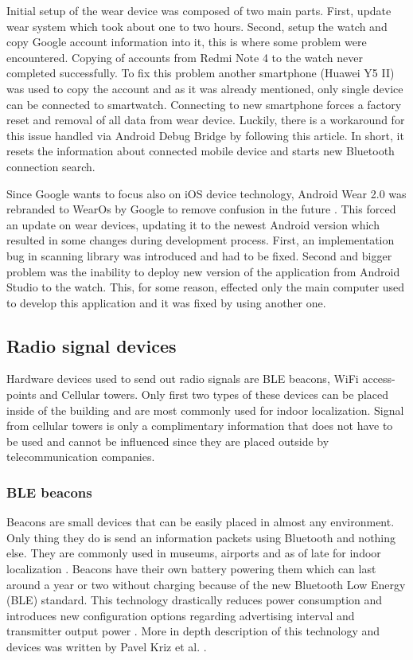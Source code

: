 Initial setup of the wear device was composed of two main parts. First, update wear system which took about one to two hours. Second, setup the watch and copy Google account information into it, this is where some problem were encountered. Copying of accounts from Redmi Note 4 to the watch never completed successfully. To fix this problem another smartphone (Huawei Y5 II) was used to copy the account and as it was already mentioned, only single device can be connected to smartwatch. Connecting to new smartphone forces a factory reset and removal of all data from wear device. Luckily, there is a workaround for this issue handled via Android Debug Bridge by following this \cite{HtPAWW} article. In short, it resets the information about connected mobile device and starts new Bluetooth connection search.

Since Google wants to focus also on iOS device technology, Android Wear 2.0 was rebranded to WearOs by Google to remove confusion in the future \cite{AWITFNM}. This forced an update on wear devices, updating it to the newest Android version which resulted in some changes during development process. First, an implementation bug in scanning library was introduced and had to be fixed. Second and bigger problem was the inability to deploy new version of the application from Android Studio to the watch. This, for some reason, effected only the main computer used to develop this application and it was fixed by using another one.

\subsection{Radio signal devices}\label{subsec:RSD}
Hardware devices used to send out radio signals are BLE beacons, WiFi access-points and Cellular towers. Only first two types of these devices can be placed inside of the building and are most commonly used for indoor localization. Signal from cellular towers is only a complimentary information that does not have to be used and cannot be influenced since they are placed outside by telecommunication companies.

\subsubsection{BLE beacons}\label{subsec:BLEBeacons}
Beacons are small devices that can be easily placed in almost any environment. Only thing they do is send an information packets using Bluetooth and nothing else. They are commonly used in museums, airports and as of late for indoor localization \cite{10TABB}. Beacons have their own battery powering them which can last around a year or two without charging because of the new Bluetooth Low Energy (BLE) standard. This technology drastically reduces power consumption and introduces new configuration options regarding advertising interval and transmitter output power \cite{IPSBOBLE}. More in depth description of this technology and devices was written by Pavel Kriz et al. \cite{IILUBLEB}.

